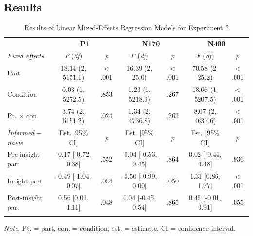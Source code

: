 \documentclass[
  english,
  man,floatsintext]{apa7}
\begin{document}
\hypertarget{results-1}{%
\subsection{Results}\label{results-1}}

\begin{table}[tbp]

\begin{center}
\begin{threeparttable}

\caption{\label{tab:exp2-table}Results of Linear Mixed-Effects Regression Models for Experiment 2\smallskip}

\footnotesize{

\begin{tabular}{lcccccc}
\toprule
 & \multicolumn{2}{c}{\textbf{P1}} & \multicolumn{2}{c}{\textbf{N170}} & \multicolumn{2}{c}{\textbf{N400}} \\
\cmidrule(r){2-3} \cmidrule(r){4-5} \cmidrule(r){6-7}
\textit{Fixed effects} & \textit{F} (\textit{df}) & \textit{p} & \textit{F} (\textit{df}) & \textit{p} & \textit{F} (\textit{df}) & \textit{p}\\
\midrule
Part & 18.14 (2, 5151.1) & < .001 & 16.39 (2, 25.0) & < .001 & 70.58 (2, 25.2) & < .001\\
Condition & 0.03 (1, 5272.5) & .853 & 1.23 (1, 5218.6) & .267 & 18.66 (1, 5207.5) & < .001\\
Pt. × con. & 3.74 (2, 5151.2) & .024 & 1.34 (2, 4736.8) & .263 & 8.07 (2, 4637.6) & < .001\\
\textit{Informed $-$  naive} & Est. [95\% CI] & \textit{p} & Est. [95\% CI] & \textit{p} & Est. [95\% CI] & \textit{p}\\ \midrule
Pre-insight part & -0.17 [-0.72, 0.38] & .552 & -0.04 [-0.53, 0.45] & .864 & 0.02 [-0.44, 0.48] & .936\\
Insight part & -0.49 [-1.04, 0.07] & .084 & -0.50 [-0.99, 0.00] & .050 & 1.31 [0.86, 1.77] & < .001\\
Post-insight part & 0.56 [0.01, 1.11] & .048 & 0.04 [-0.45, 0.54] & .865 & 0.45 [-0.01, 0.91] & .055\\
\bottomrule
\addlinespace
\end{tabular}

}

\begin{tablenotes}[para]
\normalsize{\textit{Note.} Pt. = part, con. = condition, est. = estimate, CI = confidence interval.}
\end{tablenotes}

\end{threeparttable}
\end{center}

\end{table}
\end{document}

